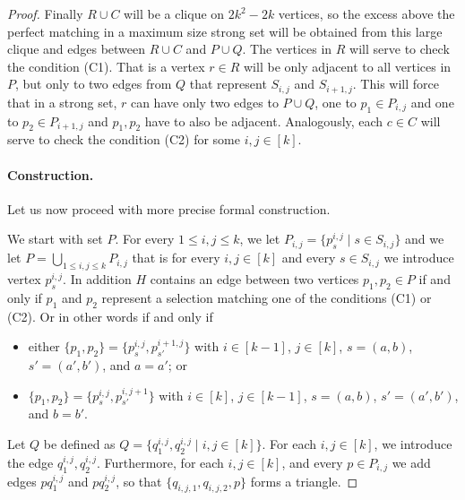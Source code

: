 \begin{proof}
Finally $R\cup C$ will be a clique on $2k^2-2k$ vertices, so the excess above the perfect matching in a maximum size strong set will be obtained from this large clique and edges between $R\cup C$ and $P\cup Q$. The vertices in $R$ will serve to check the condition (C1). That is a vertex $r\in R$ will be only adjacent to all vertices in $P$, but only to two edges from $Q$ that represent $S_{i,j}$ and $S_{i+1,j}$. This will force that in a strong set, $r$ can have only two edges to $P\cup Q$, one to $p_1\in P_{i,j}$ and one to $p_2\in P_{i+1,j}$ and $p_1,p_2$ have to also be adjacent. Analogously, each $c\in C$ will serve to check the condition (C2) for some $i,j\in [k]$.

\paragraph*{Construction.}
Let us now proceed with more precise formal construction. 

We start with set $P$.
For every $1\le i,j\le k$, we let $P_{i,j} = \{ p_s^{i,j} \mid s \in S_{i,j} \}$ and we let 
$P = \bigcup_{1\le i,j \le k }P_{i,j}$
that is for every $i,j\in [k]$ and every $s\in S_{i,j}$ we introduce vertex $p_{s}^{i,j}$. In addition $H$ contains an edge between two vertices $p_1,p_2\in P$ if and only if $p_1$ and $p_2$ represent a selection matching one of the conditions (C1) or (C2). Or in other words if and only if
\begin{itemize}
\item either $\{p_1, p_2\} = \{p_s^{i,j}, p_{s'}^{i+1,j}\}$ with $i\in [k-1]$, $j\in [k]$, $s = (a,b)$, $s' = (a',b')$, and $a=a'$; or
\item $\{p_1, p_2\} = \{p_s^{i,j}, p_{s'}^{i,j+1}\}$ with $i\in [k]$, $j\in [k-1]$, $s = (a,b)$, $s' = (a',b')$, and $b=b'$.
\end{itemize} 

Let $Q$ be defined as $Q = \{ q_{1}^{i,j}, q_2^{i,j} \mid i, j \in [k] \}$.
For each $i, j \in [k]$, we introduce the edge $q_1^{i,j}, q_2^{i,j}$.
Furthermore, for each $i, j \in [k]$, and every $p\in P_{i,j}$ we add edges $pq_1^{i,j}$ and $pq_2^{i,j}$, so that $\{ q_{i,j,1}, q_{i,j,2}, p \}$ forms a triangle.


\end{proof}
